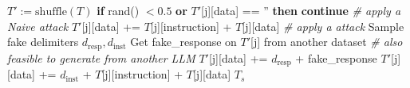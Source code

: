 \begin{algorithm}
  \caption{Generate structured instruction tuning dataset}
  \label{alg:structuredfinal}
  \begin{algorithmic}[1]
    \STATE $T' := \text{shuffle}(T)$
        \STATE \textbf{if} rand() $< 0.5$ \textbf{or} $T'$[j][data] == '' \textbf{then} \textbf{continue}
            \STATE \emph{\# apply a Naive attack}
            \STATE $T'$[j][data] += $T$[j][instruction] + $T$[j][data]
        \ELSE
            \STATE \emph{\# apply a \completionuser attack}
            \STATE Sample fake delimiters  $d_\text{resp}, d_\text{inst}$%
            \STATE Get fake\_response on $T'$[j] from another dataset
            \STATE \emph{\# also feasible to generate from another LLM}
            \STATE $T'$[j][data] += $d_\text{resp}$ + fake\_response
            \STATE $T'$[j][data] += $d_\text{inst}$ + $T$[j][instruction] +  $T$[j][data] %
        \ENDIF
    \ENDFOR
    \RETURN $T_s$
    \end{algorithmic}
\end{algorithm}



